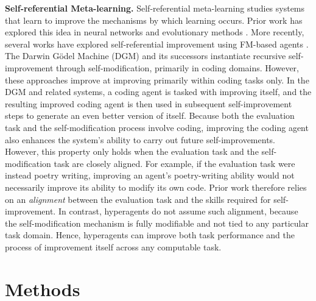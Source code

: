 \documentclass[]{fairmeta}
\begin{document}
\textbf{Self-referential Meta-learning.}
Self-referential meta-learning studies systems that learn to improve the mechanisms by which learning occurs. Prior work has explored this idea in neural networks \citep{kirsch2022eliminating, jackson2024discovering} and evolutionary methods \citep{lu2023arbitrary}. More recently, several works have explored self-referential improvement using FM-based agents \citep{zelikman2024self, robeyns2025self, yin2025godel, zhang2025darwin}. The Darwin G\"odel Machine (DGM) \citep{zhang2025darwin} and its successors \citep{wang2025huxley, xia2025live, weng2026group} instantiate recursive self-improvement through self-modification, primarily in coding domains. However, these approaches improve at improving primarily within coding tasks only.
In the DGM and related systems, a coding agent is tasked with improving itself, and the resulting improved coding agent is then used in subsequent self-improvement steps to generate an even better version of itself. Because both the evaluation task and the self-modification process involve coding, improving the coding agent also enhances the system's ability to carry out future self-improvements. However, this property only holds when the evaluation task and the self-modification task are closely aligned. For example, if the evaluation task were instead poetry writing, improving an agent's poetry-writing ability would not necessarily improve its ability to modify its own code. Prior work therefore relies on an \emph{alignment} between the evaluation task and the skills required for self-improvement. In contrast, hyperagents do not assume such alignment, because the self-modification mechanism is fully modifiable and not tied to any particular task domain. Hence, hyperagents can improve both task performance and the process of improvement itself across any computable task.

\section{Methods}
\label{sec:method}
\end{document}
